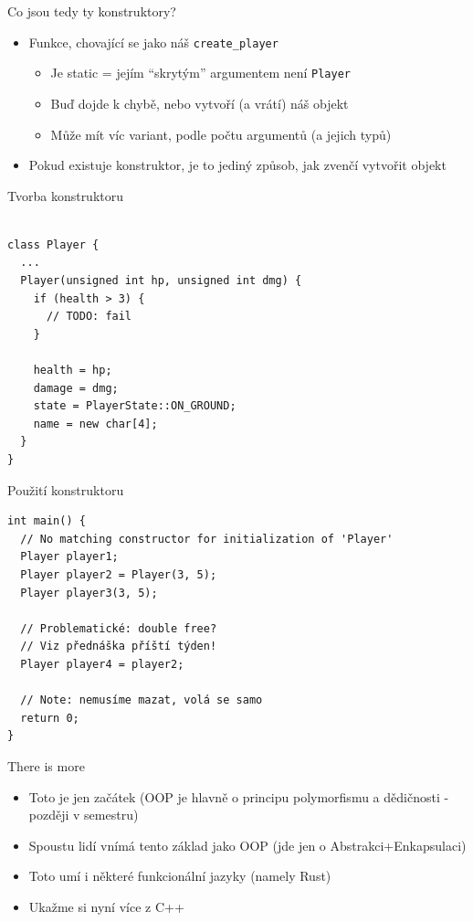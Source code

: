 \documentclass[aspectratio=1610]{beamer}
\begin{document}
\begin{frame}{Co jsou tedy ty konstruktory?}

\begin{itemize}
  \item Funkce, chovající se jako náš \texttt{create\_player}
    \begin{itemize}
      \item Je static = jejím \enquote{skrytým} argumentem není \texttt{Player}
      \item Buď dojde k chybě, nebo vytvoří (a vrátí) náš objekt
      \item Může mít víc variant, podle počtu argumentů (a jejich typů)
    \end{itemize}
  \item Pokud existuje konstruktor, je to jediný způsob, jak zvenčí vytvořit objekt
\end{itemize}

\end{frame}

\begin{frame}[fragile]{Tvorba konstruktoru}

\begin{verbatim}

class Player {
  ...
  Player(unsigned int hp, unsigned int dmg) {
    if (health > 3) {
      // TODO: fail
    }

    health = hp;
    damage = dmg;
    state = PlayerState::ON_GROUND;
    name = new char[4];
  }
}

\end{verbatim}

\end{frame}

\begin{frame}[fragile]{Použití konstruktoru}

\begin{verbatim}
int main() {
  // No matching constructor for initialization of 'Player'
  Player player1;
  Player player2 = Player(3, 5);
  Player player3(3, 5);

  // Problematické: double free?
  // Viz přednáška příští týden!
  Player player4 = player2;

  // Note: nemusíme mazat, volá se samo
  return 0;
}
\end{verbatim}

\end{frame}

\begin{frame}{There is more}

\begin{itemize}
  \item Toto je jen začátek (OOP je hlavně o principu polymorfismu a dědičnosti - později v semestru)
  \item Spoustu lidí vnímá tento základ jako OOP (jde jen o Abstrakci+Enkapsulaci)
  \item Toto umí i některé funkcionální jazyky (namely Rust)
  \item Ukažme si nyní více z C++
\end{itemize}

\end{frame}
\end{document}
